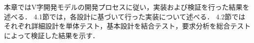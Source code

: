 
本章ではV字開発モデルの開発プロセスに従い，実装および検証を行った結果を述べる．
4.1節では，各設計に基づいて行った実装について述べる．
4.2節ではそれぞれ詳細設計を単体テスト，基本設計を結合テスト，要求分析を総合テストによって検証した結果を示す．